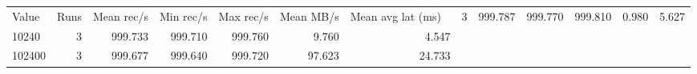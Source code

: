\begin{tabular}{lrrrrrr}
\hline
Value & Runs & Mean rec/s & Min rec/s & Max rec/s & Mean MB/s & Mean avg lat (ms) \
 & 3 & 999.787 & 999.770 & 999.810 & 0.980 & 5.627 \\
10240 & 3 & 999.733 & 999.710 & 999.760 & 9.760 & 4.547 \\
102400 & 3 & 999.677 & 999.640 & 999.720 & 97.623 & 24.733 \\
\hline
\end{tabular}
